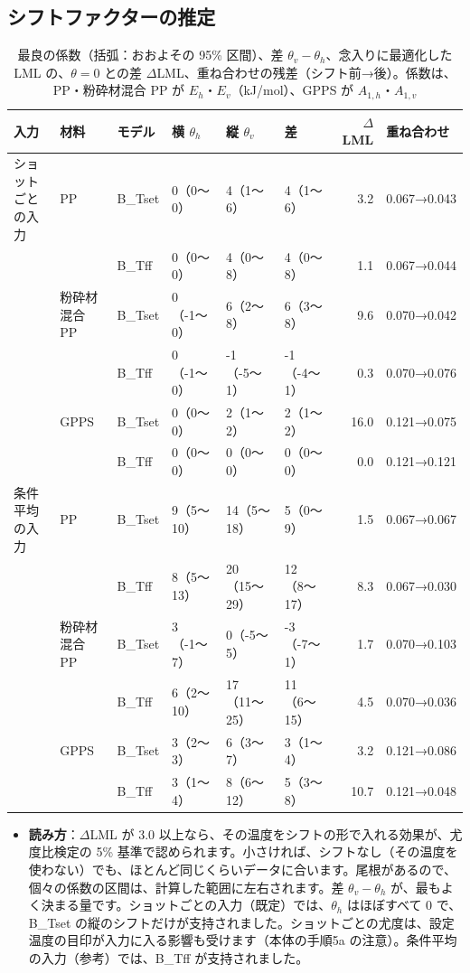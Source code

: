 \documentclass[paper=a4paper,fontsize=10.5pt,line_length=44zw,number_of_lines=38]{jlreq}
\newcommand{\Eh}{E_{h}}
\newcommand{\Ev}{E_{v}}
\newenvironment{points}{\begin{itemize}[label=$\triangleright$,leftmargin=1.5\zw,itemsep=0.3ex,topsep=0.5ex,parsep=0pt]}{\end{itemize}}
\newcommand{\pt}[1]{\item \textbf{#1}：}
\begin{document}
\subsection{シフトファクターの推定}
\begin{table}[H]
\caption{最良の係数（括弧：おおよその 95\% 区間）、差 $\theta_v-\theta_h$、念入りに最適化した LML の、$\theta=0$ との差 $\Delta$LML、重ね合わせの残差（シフト前→後）。係数は、PP・粉砕材混合 PP が $\Eh$・$\Ev$（kJ/mol）、GPPS が $A_{1,h}$・$A_{1,v}$}\label{tab:shift}
\scriptsize
\begin{tabularx}{\linewidth}{@{}lllXXXrl@{}}
\toprule
入力 & 材料 & モデル & 横 $\theta_h$ & 縦 $\theta_v$ & 差 & $\Delta$LML & 重ね合わせ \\
\midrule
ショットごとの入力 & PP & B\_Tset & 0（0〜0） & 4（1〜6） & 4（1〜6） & 3.2 & 0.067→0.043 \\
 &  & B\_Tff & 0（0〜0） & 4（0〜8） & 4（0〜8） & 1.1 & 0.067→0.044 \\
 & 粉砕材混合 PP & B\_Tset & 0（-1〜0） & 6（2〜8） & 6（3〜8） & 9.6 & 0.070→0.042 \\
 &  & B\_Tff & 0（-1〜0） & -1（-5〜1） & -1（-4〜1） & 0.3 & 0.070→0.076 \\
 & GPPS & B\_Tset & 0（0〜0） & 2（1〜2） & 2（1〜2） & 16.0 & 0.121→0.075 \\
 &  & B\_Tff & 0（0〜0） & 0（0〜0） & 0（0〜0） & 0.0 & 0.121→0.121 \\
\midrule
条件平均の入力 & PP & B\_Tset & 9（5〜10） & 14（5〜18） & 5（0〜9） & 1.5 & 0.067→0.067 \\
 &  & B\_Tff & 8（5〜13） & 20（15〜29） & 12（8〜17） & 8.3 & 0.067→0.030 \\
 & 粉砕材混合 PP & B\_Tset & 3（-1〜7） & 0（-5〜5） & -3（-7〜1） & 1.7 & 0.070→0.103 \\
 &  & B\_Tff & 6（2〜10） & 17（11〜25） & 11（6〜15） & 4.5 & 0.070→0.036 \\
 & GPPS & B\_Tset & 3（2〜3） & 6（3〜7） & 3（1〜4） & 3.2 & 0.121→0.086 \\
 &  & B\_Tff & 3（1〜4） & 8（6〜12） & 5（3〜8） & 10.7 & 0.121→0.048 \\

\bottomrule
\end{tabularx}
\end{table}
\begin{points}
\pt{読み方}$\Delta$LML が 3.0 以上なら、その温度をシフトの形で入れる効果が、尤度比検定の 5\% 基準で認められます。小さければ、シフトなし（その温度を使わない）でも、ほとんど同じくらいデータに合います。尾根があるので、個々の係数の区間は、計算した範囲に左右されます。差 $\theta_v-\theta_h$ が、最もよく決まる量です。ショットごとの入力（既定）では、$\theta_h$ はほぼすべて 0 で、B\_Tset の縦のシフトだけが支持されました。ショットごとの尤度は、設定温度の目印が入力に入る影響も受けます（本体の手順5a の注意）。条件平均の入力（参考）では、B\_Tff が支持されました。
\end{points}
\end{document}
